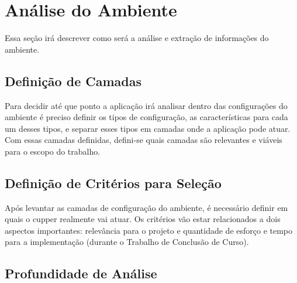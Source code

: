 \section{Análise do Ambiente}
Essa seção irá descrever como será a análise e extração de informações do ambiente. 


\subsection{Definição de Camadas}
Para decidir até que ponto a aplicação irá analisar dentro das configurações
do ambiente é preciso definir os tipos de configuração, as características para
cada um desses tipos, e separar esses tipos em camadas onde a aplicação pode atuar.
Com essas camadas definidas, defini-se quais camadas são relevantes e viáveis
para o escopo do trabalho.

\subsection{Definição de Critérios para Seleção}
Após levantar as camadas de configuração do ambiente, é necessário definir em quais o cupper realmente vai atuar. Os critérios vão estar relacionados a dois aspectos importantes: relevância para o projeto e quantidade de esforço e tempo para a implementação (durante o Trabalho de Conclusão de Curso). 

\subsection{Profundidade de Análise}

